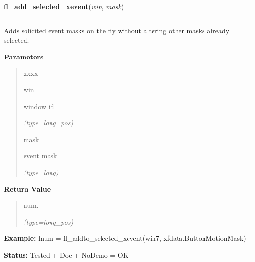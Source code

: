     \vspace{0.5ex}

\hspace{.8\funcindent}\begin{boxedminipage}{\funcwidth}

    \raggedright \textbf{fl\_add\_selected\_xevent}(\textit{win}, \textit{mask})

    \vspace{-1.5ex}

    \rule{\textwidth}{0.5\fboxrule}
\setlength{\parskip}{2ex}
    Adds solicited event masks on the fly without altering other masks 
    already selected.

\setlength{\parskip}{1ex}
      \textbf{Parameters}
      \vspace{-1ex}

      \begin{quote}
        \begin{Ventry}{xxxx}

          \item[win]

          window id

            {\it (type=long\_pos)}

          \item[mask]

          event mask

            {\it (type=long)}

        \end{Ventry}

      \end{quote}

      \textbf{Return Value}
    \vspace{-1ex}

      \begin{quote}
      num.

      {\it (type=long\_pos)}

      \end{quote}

\textbf{Example:} lnum = fl\_addto\_selected\_xevent(win7, xfdata.ButtonMotionMask)



\textbf{Status:} Tested + Doc + NoDemo = OK



    \end{boxedminipage}

    \label{xformslib:flxbasic:fl_set_idle_delta}

